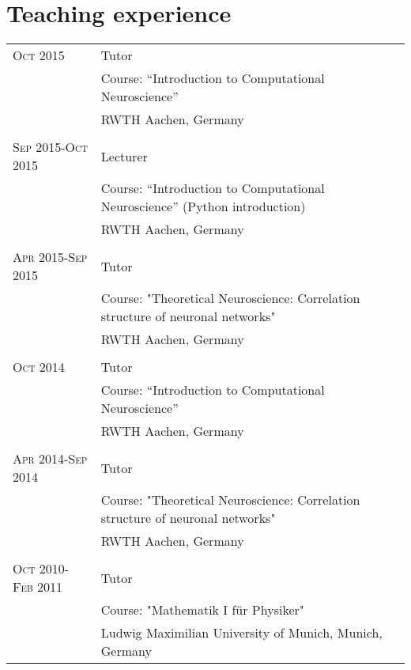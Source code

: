 \documentclass[a4paper,10pt]{article}
\begin{document}
\section{Teaching experience}
\begin{tabular}{>{\hfill}p{3.15cm}|p{10.4cm}}
  \textsc{Oct} 2015 & Tutor \\
  & \footnotesize Course: ``Introduction to Computational Neuroscience'' \\
  & \footnotesize RWTH Aachen, Germany \\
  \multicolumn{2}{c}{} \\
  \textsc{Sep} 2015-\textsc{Oct} 2015 & Lecturer \\
  & \footnotesize Course: ``Introduction to Computational Neuroscience'' (Python introduction) \\
  & \footnotesize RWTH Aachen, Germany \\
  \multicolumn{2}{c}{} \\
  \textsc{Apr} 2015-\textsc{Sep} 2015 & Tutor \\ 
  & \footnotesize Course: "Theoretical Neuroscience: Correlation structure of neuronal networks" \\
  & \footnotesize RWTH Aachen, Germany \\
  \multicolumn{2}{c}{} \\
  \textsc{Oct} 2014 & Tutor \\
  & \footnotesize Course: ``Introduction to Computational Neuroscience'' \\
  & \footnotesize RWTH Aachen, Germany \\
  \multicolumn{2}{c}{} \\
  \textsc{Apr} 2014-\textsc{Sep} 2014 & Tutor \\ 
  & \footnotesize Course: "Theoretical Neuroscience: Correlation structure of neuronal networks" \\
  & \footnotesize RWTH Aachen, Germany \\
  \multicolumn{2}{c}{} \\
  \textsc{Oct} 2010-\textsc{Feb} 2011 & Tutor \\
  & \footnotesize Course: "Mathematik I f\"ur Physiker" \\
  & \footnotesize Ludwig Maximilian University of Munich, Munich, Germany \\
\end{tabular}
\end{document}
